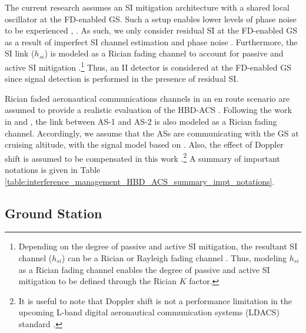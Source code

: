 The current research assumes an SI mitigation architecture with a shared local oscillator at the FD-enabled GS. Such a setup enables lower levels of phase noise to be experienced \cite{syrjala2014analysis}, \cite{li2018self}. As such, we only consider residual SI at the FD-enabled GS as a result of imperfect SI channel estimation and phase noise \cite{sahai2013impact}. Furthermore, the SI link ($h_{si}$) is modeled as a Rician fading channel to account for passive and active SI mitigation \cite{ahmed2015all}.\footnote{Depending on the degree of passive and active SI mitigation, the resultant SI channel ($h_{si}$) can be a Rician or Rayleigh fading channel \cite{ahmed2015all}. Thus, modeling $h_{si}$ as a Rician fading channel enables the degree of passive and active SI mitigation to be defined through the Rician $K$ factor.} Thus, an II detector is considered at the FD-enabled GS since signal detection is performed in the presence of residual SI.

Rician faded aeronautical communications channels in an en route scenario are assumed to provide a realistic evaluation of the HBD-ACS \cite{haas2002aeronautical,matolak2017air_suburban,yuan2018capacity}. Following the work in \cite{haas2002aeronautical} and \cite{yuan2018capacity}, the link between AS-1 and AS-2 is also modeled as a Rician fading channel. Accordingly, we assume that the ASs are communicating with the GS at cruising altitude, with the signal model based on \cite{sahai2013impact}. Also, the effect of Doppler shift is assumed to be compensated in this work \cite{lee2018uav}.\footnote{It is useful to note that Doppler shift is not a performance limitation in the upcoming L-band digital aeronautical communication systems (LDACS) standard \cite{jamal2017fbmc}.} A summary of important notations is given in Table \ref{table:interference_management_HBD_ACS_summary_impt_notations}.

\subsection{Ground Station}

